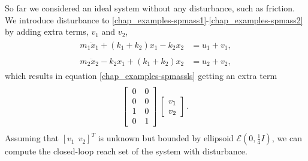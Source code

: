 \documentclass[letterpaper,10pt,english]{sphinxmanual}
\begin{document}
So far we considered an ideal system without any disturbance, such as
friction. We introduce disturbance to \eqref{chap_examples-spmass1}-\eqref{chap_examples-spmass2} by adding
extra terms, \(v_1\) and \(v_2\),
\label{chap_examples:equation-smdist1}\begin{gather}
\begin{split}m_1\ddot{x}_1+(k_1+k_2)x_1-k_2x_2 & = u_1 + v_1,\end{split}\label{chap_examples-smdist1}
\end{gather}\label{chap_examples:equation-smdist2}\begin{gather}
\begin{split}m_2\ddot{x}_2-k_2x_1+(k_1+k_2)x_2 & = u_2 + v_2,\end{split}\label{chap_examples-smdist2}
\end{gather}
which results in equation \eqref{chap_examples-spmassls} getting an extra term
\begin{gather}
\begin{split}\left[\begin{array}{cc}
0 & 0\\
0 & 0\\
1 & 0\\
0 & 1\end{array}\right]\left[\begin{array}{c}
v_1\\
v_2\end{array}\right].\end{split}\notag
\end{gather}
Assuming that \([v_1 ~~ v_2]^T\) is unknown but bounded by
ellipsoid \({\mathcal E}(0, \frac{1}{4}I)\), we can compute the
closed-loop reach set of the system with disturbance.
\end{document}
